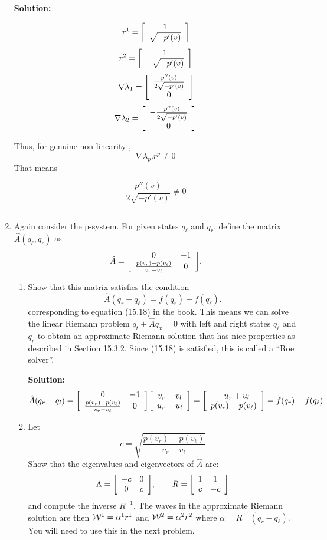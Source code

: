 \documentclass[11pt]{article}
\newenvironment{mat}{\left[ \begin{array}{ccccccccccccc}}{\end{array}\right]}
\newcommand\bcm{\begin{mat}}
\newcommand\ecm{\end{mat}}
\begin{document}
\begin{enumerate}
\vskip 1cm
{\bf Solution:}

 \[r^1 = \bcm 1\\  \sqrt{-p'(v)}\ecm \]
  \[r^2 = \bcm 1\\  -\sqrt{-p'(v)}\ecm \]
\[\nabla \lambda_1 = \bcm \frac{p''(v)}{2 \sqrt{- p'(v)} }\\  0\ecm  \]
\[\nabla \lambda_2 =   \bcm -\frac{p''(v)}{2 \sqrt{- p'(v)} }\\  0\ecm  \]

Thus, for genuine non-linearity ,
 \[\nabla \lambda_p . r^p \neq 0 \]
 That means
 
 \[\frac{p''(v)}{2 \sqrt{- p'(v)} }\neq 0 \]
 
 
\vskip 1cm
\hrule
\item
Again consider the p-system.  For given states $q_\ell$ and $q_r$, 
define the matrix $\hat A(q_\ell,q_r)$ as
\[
\hat A = \bcm 0&-1\\ \frac{p(v_r)-p(v_\ell)}{v_r - v_\ell} & 0\ecm.
\]

\begin{enumerate} 
\item Show that this matrix satisfies the condition 
\[
\hat A (q_r - q_\ell) = f(q_r) - f(q_\ell).
\]
corresponding to equation (15.18) in the book.  This means we can
solve the linear Riemann problem $q_t + \hat A q_x = 0$ with left and right
states $q_\ell$ and $q_r$ to obtain an approximate Riemann solution that has
nice properties as described in Section 15.3.2.  Since (15.18) is satisfied,
this is called a ``Roe solver''.

\vskip 1cm
{\bf Solution:}
\[\hat A (q_r -q_l) = \bcm 0&-1\\ \frac{p(v_r)-p(v_\ell)}{v_r - v_\ell} & 0\ecm   \bcm v_r - v_l\\ u_r - u_l\ecm =   \bcm  -u_r + u_l\\ p(v_r)-p(v_\ell)\ecm = f(q_r) - f(q_\ell) \]
\item Let  
\[
c = \sqrt{\frac{p(v_r)-p(v_\ell)}{v_r - v_\ell}}
\]
Show that the eigenvalues and eigenvectors of $\hat A$ are:
\[
\Lambda = \bcm -c&0\\ 0&c\ecm, \qquad R = \bcm 1&1\\c&-c \ecm
\]
and compute the inverse $R^{-1}$.  The waves in the approximate Riemann
solution are then ${\cal W}^1 = \alpha^1 r^1$ and 
${\cal W}^2 = \alpha^2 r^2$ where $\alpha = R^{-1}(q_r - q_\ell)$.  You will
need to use this in the next problem.


\end{enumerate}
\end{enumerate}
\end{document}
